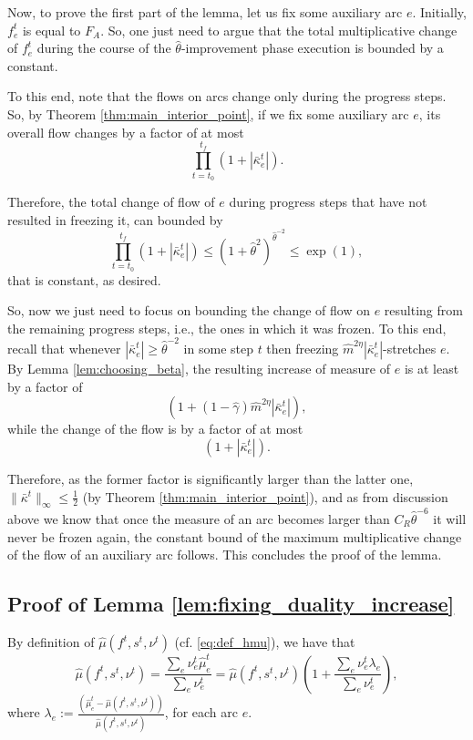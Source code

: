 \documentclass[11pt, letterpaper]{article}
\newcommand{\crestrict}{C_{R}}
\newcommand{\fauxiliary}{F_{A}}
\newcommand{\inorm}[1]{\|#1\|_{\infty}}
\newcommand{\hm}{\widehat{m}}
\newcommand{\hmu}{\hat{\mu}}
\newcommand{\hgamma}{\hat{\gamma}}
\newcommand{\htheta}{\hat{\theta}}
\newcommand{\okappa}{\bar{\kappa}}
\newcommand{\vnu}{\boldsymbol{\mathit{\nu}}}
\newcommand{\ovkappa}{\boldsymbol{\mathit{\bar{\kappa}}}}
\newcommand{\ff}{\boldsymbol{\mathit{f}}}
\renewcommand{\ss}{\boldsymbol{\mathit{s}}}
\begin{document}
Now, to prove the first part of the lemma, let us fix some auxiliary arc $e$. Initially, $f_e^t$ is equal to $\fauxiliary$. So, one just need to argue that the total multiplicative change of $f_e^t$ during the course of the $\htheta$-improvement phase execution is bounded by a constant. 

To this end, note that the flows on arcs change only during the progress steps. So, by Theorem \ref{thm:main_interior_point}, if we fix some auxiliary arc $e$, its overall flow changes by a factor of at most
\[
\prod_{t=t_0}^{t_f} (1+|\okappa_e^t|).
\]

Therefore, the total change of flow of $e$ during progress steps that have not resulted in freezing it, can bounded by
\[
\prod_{t=t_0}^{t_f} (1+|\okappa_e^t|)\leq (1+\htheta^{2})^{\htheta^{-2}} \leq \exp(1),
\]
that is constant, as desired. 

So, now we just need to focus on bounding the change of flow on $e$ resulting from the remaining progress steps, i.e., the ones in which it was frozen. To this end, recall that whenever $|\okappa_e^t|\geq \htheta^{-2}$ in some step $t$ then freezing $\hm^{2\eta}|\okappa_e^t|$-stretches $e$. By Lemma \ref{lem:choosing_beta}, the resulting increase of measure of $e$ is at least by a factor of 
\[
\left(1+ (1-\hgamma) \hm^{2\eta}|\okappa_e^t|\right),
\] 
while the change of the flow is by a factor of at most
\[
\left(1+|\okappa_e^t|\right).
\]

Therefore, as the former factor is significantly larger than the latter one, $\inorm{\ovkappa^t}\leq \frac{1}{2}$ (by Theorem \ref{thm:main_interior_point}), and as from discussion above we know that once the measure of an arc becomes larger than $\crestrict\htheta^{-6}$ it will never be frozen again, the constant bound of the maximum multiplicative change of the flow of an auxiliary arc follows. This concludes the proof of the lemma.

\subsection{Proof of Lemma \ref{lem:fixing_duality_increase}}\label{app:fixing_duality_increase}


By definition of $\hmu(\ff^{t},\ss^{t},\vnu^{t})$ (cf. \eqref{eq:def_hmu}), we have that
\begin{equation*}
\hmu(\ff^{t},\ss^{t},\vnu^{t})=\frac{\sum_{e} \nu_e^t \hmu_e^t}{\sum_{e} \nu_e^t }= \hmu(\ff^{t},\ss^{t},\vnu^{t}) \left(1+ \frac{\sum_{e} \nu_e^t \lambda_e }{\sum_{e} \nu_e^t}\right),
\end{equation*}
where $\lambda_e:=\frac{(\hmu_e^t-\hmu(\ff^{t},\ss^{t},\vnu^{t}))}{\hmu(\ff^{t},\ss^{t},\vnu^{t})}$, for each arc $e$.
\end{document}
